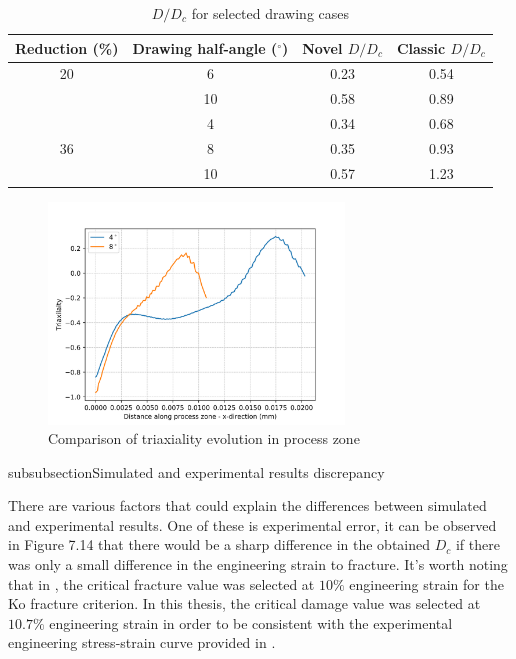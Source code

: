 \documentclass[sn-mathphys,Numbered,draft]{sn-jnl}%
\begin{document}
\begin{table}[htb]
	\centering
		\begin{tabular}{cccc} \hline
			Reduction (\%) & Drawing half-angle ($^{\circ}$) &  Novel $D/D_c$ & Classic $D/D_c$\\ \hline 

   		20 & 6 & 0.23 & 0.54\\
      	 & 10 & 0.58 & 0.89\\
			\hline
			 & 4 & 0.34 & 0.68\\
      	36 & 8 & 0.35 & 0.93\\
             & 10 & 0.57 & 1.23\\
			\hline
		\end{tabular}
	\caption{$D/D_c$ for selected drawing cases}
	\label{tab:material_properties}
\end{table}

\begin{figure}[htb]
\begin{center}
	\includegraphics[width=0.7\textwidth]{./Figures/SimulationAndAnalysis/compareCellData/degreeCompare.png}
\caption{Comparison of triaxiality evolution in process zone}
\label{fig:notchedRoundBAr}
\end{center}
\end{figure}
\FloatBarrier

subsubsection{Simulated and experimental results discrepancy}

There are various factors that could explain the differences between simulated and experimental results. One of these is experimental error, it can be observed in Figure 7.14 that there would be a sharp difference in the obtained $D_c$ if there was only a small difference in the engineering strain to fracture. It's worth noting that in \citet{roh_process_2021}, the critical fracture value was selected at $10\%$ engineering strain for the Ko fracture criterion. In this thesis, the critical damage value was selected at $10.7\%$ engineering strain in order to be consistent with the experimental engineering stress-strain curve provided in \citet{roh_process_2021}.
\end{document}
